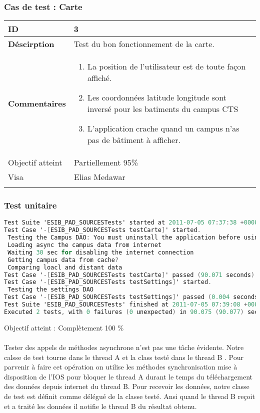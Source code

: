 		 		 \subsubsection*{Cas de test : Carte}
		 		 		 \begin{longtable}{m{4cm}|p{10cm}|}
		 		 		 \textbf{ ID} & 3 \\
		 		 		 \hline \textbf{Déscirption} &  Test du bon fonctionnement de la carte.\\
		 		 		 \hline \textbf{Commentaires} &  
		 		 		 	 	 \begin{enumerate}
	 		 		 		 	 		\item La position de l'utilisateur est de toute façon affiché.
	 		 							\item Les coordonnées latitude longitude sont inversé pour les batiments du campus CTS
	 		 							\item {\color{red}L'application crache quand un campus n'as pas de bâtiment à afficher}.
	 		 		 		 	\end{enumerate} \\
	 		 		 		  				\hline Objectif atteint & {\color{orange} Partiellement 95\% \XBox } \\
	 		 		 		  				\hline Visa & Elias Medawar 	\\
		 		 		 \\
		 		 \end{longtable} 
		 		 \subsubsection*{Test unitaire}
		 		 \begin{lstlisting}[language=C,caption = Log des test unitaires]
Test Suite 'ESIB_PAD_SOURCESTests' started at 2011-07-05 07:37:38 +0000
Test Case '-[ESIB_PAD_SOURCESTests testCarte]' started.
 Testing the Campus DAO: You must uninstall the application before using this test
 Loading async the campus data from internet
 Waiting 30 sec for disabling the internet connection
 Getting campus data from cache?
 Comparing loacl and distant data
Test Case '-[ESIB_PAD_SOURCESTests testCarte]' passed (90.071 seconds).
Test Case '-[ESIB_PAD_SOURCESTests testSettings]' started.
 Testing the settings DAO
Test Case '-[ESIB_PAD_SOURCESTests testSettings]' passed (0.004 seconds).
Test Suite 'ESIB_PAD_SOURCESTests' finished at 2011-07-05 07:39:08 +0000.
Executed 2 tests, with 0 failures (0 unexpected) in 90.075 (90.077) seconds
		 		 \end{lstlisting}
		 		Objectif atteint : {\color{green}Complètement 100 \% \CheckedBox}\\
		 		\\
		 		Tester des appels de méthodes asynchrone n'est pas une tâche évidente. Notre calsse de test tourne dans le thread A et la class testé dans le thread B . Pour parvenir à faire cet opération on utilise les méthodes synchronisation mise à disposition de l'IOS pour bloquer le thread A durant le temps du téléchargement des données depuis internet du thread B. Pour recevoir les données, notre classe de test est définit comme délégué de la classe testé. Ansi quand le thread B reçoit et a traité les données il notifie le thread B du résultat obtenu.
